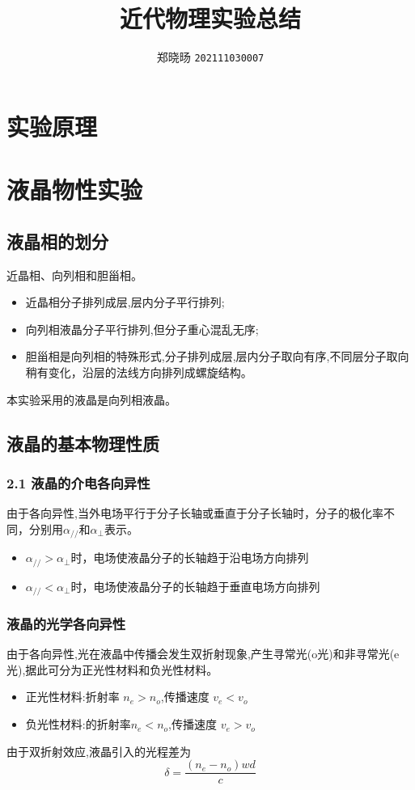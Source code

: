 \documentclass[12pt, a4paper]{article}
\title{近代物理实验总结}
\author{郑晓旸 \texttt{202111030007}}
\date{}
\begin{document}
\maketitle

\section{实验原理}

\section{液晶物性实验}

\subsection{液晶相的划分}
近晶相、向列相和胆甾相。
\begin{itemize}
    \item 近晶相分子排列成层,层内分子平行排列;
    \item 向列相液晶分子平行排列,但分子重心混乱无序;
    \item 胆甾相是向列相的特殊形式,分子排列成层,层内分子取向有序,不同层分子取向稍有变化，沿层的法线方向排列成螺旋结构。
\end{itemize}
本实验采用的液晶是向列相液晶。

\subsection{液晶的基本物理性质}

\subsubsection{2.1 液晶的介电各向异性}
由于各向异性,当外电场平行于分子长轴或垂直于分子长轴时，分子的极化率不同，分别用$\alpha_{//}$和$\alpha_{\perp}$表示。
\begin{itemize}
    \item $\alpha_{//} > \alpha_{\perp}$时，电场使液晶分子的长轴趋于沿电场方向排列
    \item $\alpha_{//} < \alpha_{\perp}$时，电场使液晶分子的长轴趋于垂直电场方向排列
\end{itemize}

\subsubsection{液晶的光学各向异性}
由于各向异性,光在液晶中传播会发生双折射现象,产生寻常光(o光)和非寻常光(e光),据此可分为正光性材料和负光性材料。
\begin{itemize}
    \item 正光性材料:折射率 $n_e>n_o$,传播速度 $v_e<v_o$
    \item 负光性材料:的折射率$n_e<n_o$,传播速度 $v_e>v_o$
\end{itemize}
由于双折射效应,液晶引入的光程差为
\begin{equation}
    \delta = \frac{(n_e-n_o)wd}{c}
\end{equation}
\end{document}
